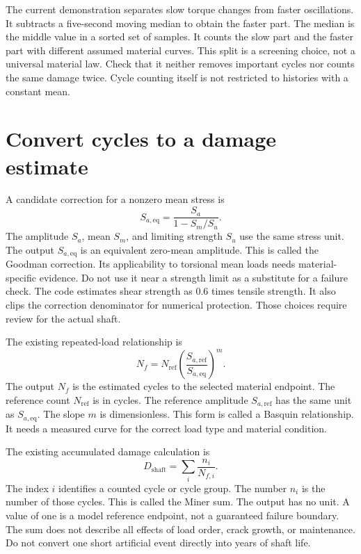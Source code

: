 \documentclass[11pt,a4paper]{report}
\begin{document}
The current demonstration separates slow torque changes from faster oscillations.
It subtracts a five-second moving median to obtain the faster part.
The median is the middle value in a sorted set of samples.
It counts the slow part and the faster part with different assumed material curves.
This split is a screening choice, not a universal material law.
Check that it neither removes important cycles nor counts the same damage twice.
Cycle counting itself is not restricted to histories with a constant mean.

\section{Convert cycles to a damage estimate}
A candidate correction for a nonzero mean stress is
\begin{equation}
S_{a,\mathrm{eq}}=\frac{S_a}{1-S_m/S_u}.
\end{equation}
The amplitude $S_a$, mean $S_m$, and limiting strength $S_u$ use the same stress unit.
The output $S_{a,\mathrm{eq}}$ is an equivalent zero-mean amplitude.
This is called the Goodman correction.
Its applicability to torsional mean loads needs material-specific evidence.
Do not use it near a strength limit as a substitute for a failure check.
The code estimates shear strength as 0.6 times tensile strength.
It also clips the correction denominator for numerical protection.
Those choices require review for the actual shaft.

The existing repeated-load relationship is
\begin{equation}
N_f=N_{\mathrm{ref}}
\left(\frac{S_{a,\mathrm{ref}}}{S_{a,\mathrm{eq}}}\right)^m.
\end{equation}
The output $N_f$ is the estimated cycles to the selected material endpoint.
The reference count $N_{\mathrm{ref}}$ is in cycles.
The reference amplitude $S_{a,\mathrm{ref}}$ has the same unit as $S_{a,\mathrm{eq}}$.
The slope $m$ is dimensionless.
This form is called a Basquin relationship.
It needs a measured curve for the correct load type and material condition.

The existing accumulated damage calculation is
\begin{equation}
D_{\mathrm{shaft}}=\sum_i \frac{n_i}{N_{f,i}}.
\label{eq:miner}
\end{equation}
The index $i$ identifies a counted cycle or cycle group.
The number $n_i$ is the number of those cycles.
This is called the Miner sum.
The output has no unit.
A value of one is a model reference endpoint, not a guaranteed failure boundary.
The sum does not describe all effects of load order, crack growth, or maintenance.
Do not convert one short artificial event directly into years of shaft life.
\end{document}

